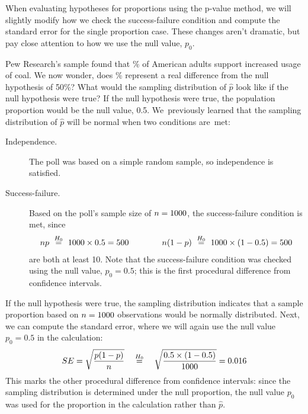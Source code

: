 When evaluating hypotheses for proportions using the
p-value method,
we will slightly modify how we check the success-failure
condition and compute the standard error for the
single proportion case.
These changes aren't dramatic, but pay close attention
to how we use the null value, $p_0$.

\begin{examplewrap}
\begin{nexample}{Pew Research's sample found that
    \pewcoalpollpercent{}\%
    of American adults support increased usage of coal.
    We now wonder, does \pewcoalpollpercent{}\% represent
    a real difference from the null hypothesis of 50\%?
    What would the sampling distribution of $\hat{p}$
    look like if the null hypothesis were true?}
  If the null hypothesis were true, the population proportion
  would be the null value, 0.5.
  We~previously learned that
  the sampling distribution of $\hat{p}$ will be normal when
  two conditions are~met:
  \begin{description}
    \item[Independence.]
        The poll was based on a simple random sample,
        so independence is satisfied.
    \item[Success-failure.]
        Based on the poll's sample size of
        $n = 1000{}$,
        the success-failure condition is met, since
        \begin{align*}
        np ~ \stackrel{H_0}{=}
            ~ 1000{} \times 0.5{}
            = 500
        \qquad\qquad
        n (1 - p) ~ \stackrel{H_0}{=}
            ~ 1000{} \times
                (1 - 0.5{})
            = 500
        \end{align*}
        are both at least 10.
        Note that the success-failure condition was checked
        using the null value, $p_0 = 0.5$;
        this is the first procedural difference from
        confidence intervals.
  \end{description}
  If the null hypothesis were true, the sampling distribution
  indicates that a sample proportion based on
  $n = 1000{}$ observations
  would be normally distributed. Next, we can compute the standard
  error, where we will again use the null value $p_0 = 0.5$ in the
  calculation:
  \begin{align*}
  SE = \sqrt{\frac{p (1 - p)}{n}}
      \quad \stackrel{H_0}{=}
          \quad \sqrt{\frac{0.5{} \times (1 - 0.5{})}{1000{}}}
      = 0.016{}
  \end{align*}
  This marks the other procedural difference from confidence
  intervals: since the sampling distribution is determined
  under the null proportion, the null value $p_0$ was used for
  the proportion in the calculation rather than $\hat{p}$.


\end{nexample}
\end{examplewrap}
